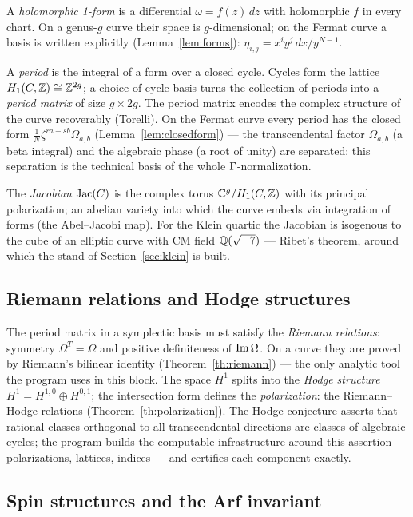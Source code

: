 A \emph{holomorphic 1-form} is a differential $\omega=f(z)\,dz$ with
holomorphic $f$ in every chart. On a genus-$g$ curve their space is
$g$-dimensional; on the Fermat curve a basis is written explicitly
(Lemma~\ref{lem:forms}): $\eta_{i,j}=x^iy^j\,dx/y^{N-1}$.

A \emph{period} is the integral of a form over a closed cycle. Cycles
form the lattice $H_1(C,\mathbb{Z})\cong\mathbb{Z}^{2g}$; a choice of cycle basis
turns the collection of periods into a \emph{period matrix} of size
$g\times2g$. The period matrix encodes the complex structure of the
curve recoverably (Torelli). On the Fermat curve every period has
the closed form $\frac1N\zeta^{ra+sb}\Omega_{a,b}$
(Lemma~\ref{lem:closedform}) --- the transcendental factor
$\Omega_{a,b}$ (a beta integral) and the algebraic phase (a root of
unity) are separated; this separation is the technical basis of the
whole $\Gamma$-normalization.

The \emph{Jacobian} $\operatorname{Jac}(C)$ is the complex torus
$\mathbb{C}^g/H_1(C,\mathbb{Z})$ with its principal polarization; an abelian
variety into which the curve embeds via integration of forms (the
Abel--Jacobi map). For the Klein quartic the Jacobian is isogenous
to the cube of an elliptic curve with CM field $\mathbb{Q}(\sqrt{-7})$ ---
Ribet's theorem, around which the stand of Section~\ref{sec:klein}
is built.

\subsection{Riemann relations and Hodge structures}

The period matrix in a symplectic basis must satisfy the \emph{Riemann
relations}: symmetry $\Omega^T=\Omega$ and positive definiteness of
$\operatorname{Im}\Omega$. On a curve they are proved by Riemann's bilinear
identity (Theorem~\ref{th:riemann}) --- the only analytic tool the
program uses in this block. The space $H^1$ splits into the
\emph{Hodge structure} $H^1=H^{1,0}\oplus H^{0,1}$; the intersection
form defines the \emph{polarization}: the Riemann--Hodge relations
(Theorem~\ref{th:polarization}). The Hodge conjecture asserts that
rational classes orthogonal to all transcendental directions are
classes of algebraic cycles; the program builds the computable
infrastructure around this assertion --- polarizations, lattices,
indices --- and certifies each component exactly.

\subsection{Spin structures and the Arf invariant}

